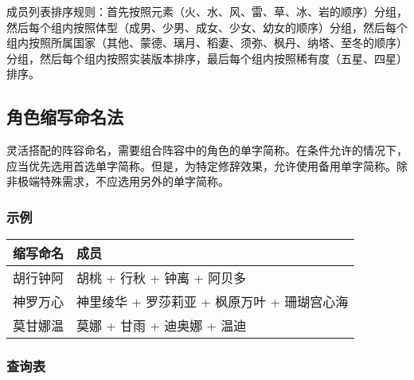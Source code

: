 成员列表排序规则：首先按照元素（火、水、风、雷、草、冰、岩的顺序）分组，然后每个组内按照体型（成男、少男、成女、少女、幼女的顺序）分组，然后每个组内按照所属国家（其他、蒙德、璃月、稻妻、须弥、枫丹、纳塔、至冬的顺序）分组，然后每个组内按照实装版本排序，最后每个组内按照稀有度（五星、四星）排序。


\subsection{角色缩写命名法}

灵活搭配的阵容命名，需要组合阵容中的角色的单字简称。在条件允许的情况下，应当优先选用首选单字简称。但是，为特定修辞效果，允许使用备用单字简称。除非极端特殊需求，不应选用另外的单字简称。

\subsubsection{示例}

\noindent\begin{tabu}{|c|X[c]|}
	\hline
	{缩写命名} & {成员}                                        \\
	\hline
	{胡行钟阿}     & {胡桃 + 行秋 + 钟离 + 阿贝多}                 \\
	{神罗万心}     & {神里绫华 + 罗莎莉亚 + 枫原万叶 + 珊瑚宫心海} \\
	{莫甘娜温}     & {莫娜 + 甘雨 + 迪奥娜 + 温迪}                 \\
	\hline
\end{tabu}

\subsubsection{查询表}

